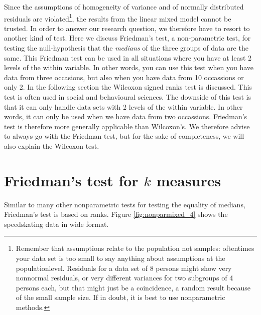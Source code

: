 \documentclass[]{book}\usepackage[]{graphicx}\usepackage[]{color}
\begin{document}
Since the assumptions of homogeneity of variance and of normally distributed residuals are violated\footnote{Remember that assumptions relate to the population not samples: oftentimes your data set is too small to say anything about assumptions at the populationlevel. Residuals for a data set of 8 persons might show very nonnormal residuals, or very different variances for two subgroups of 4 persons each, but that might just be a coincidence, a random result because of the small sample size. If in doubt, it is best to use nonparametric methods.}, the results from the linear mixed model cannot be trusted. In order to answer our research question, we therefore have to resort to another kind of test. Here we discuss Friedman's test, a non-parametric test, for testing the null-hypothesis that the \textit{medians} of the three groups of data are the same. This Friedman test can be used in all situations where you have at least 2 levels of the within variable. In other words, you can use this test when you have data from three occasions, but also when you have data from 10 occassions or only 2. In the following section the Wilcoxon signed ranks test is discussed. This test is often used in social and behavioural sciences. The downside of this test is that it can only handle data sets with 2 levels of the within variable. In other words, it can only be used when we have data from two occassions. Friedman's test is therefore more generally applicable than Wilcoxon's. We therefore advise to always go with the Friedman test, but for the sake of completeness, we will also explain the Wilcoxon test.





\section{Friedman's test for $k$ measures}


Similar to many other nonparametric tests for testing the equality of medians, Friedman's test is based on ranks. Figure \ref{fig:nonparmixed_4} shows the speedskating data in wide format.
\end{document}

